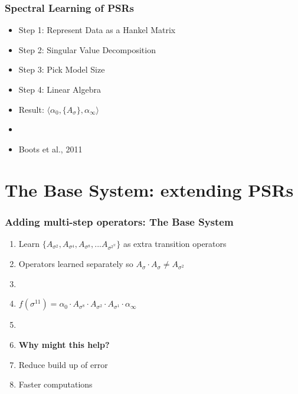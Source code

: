\documentclass{beamer}
\begin{document}

\begin{frame}
\frametitle{Spectral Learning of PSRs}

\begin{itemize}
\item[] Step 1: Represent Data as a Hankel Matrix
\item[] Step 2: Singular Value Decomposition
\item[] Step 3: Pick Model Size
\item[] Step 4: Linear Algebra
\item[] Result: $\langle \alpha_0, \{A_\sigma\},\alpha_\infty \rangle$ 
\item[]
\item[] Boots et al., 2011
\end{itemize}

\end{frame}

\section{The Base System: extending PSRs}

\begin{frame}
\frametitle{Adding multi-step operators: The Base System}
\begin{enumerate}

\item Learn $\{A_{\sigma^2}, A_{\sigma^4}, A_{\sigma^8}, ... A_{\sigma^{2^N}}\}$ as extra transition operators
\item[] Operators learned separately so $A_{\sigma} \cdot A_{\sigma} \neq A_{\sigma^2}$
\item[]

\item $f(\sigma^{11}) = \alpha_0 \cdot A_{\sigma^8} \cdot A_{\sigma^2} \cdot A_{\sigma^1} \cdot \alpha_\infty$
\item[]

\item \textbf{Why might this help?}
\item[] Reduce build up of error
\item[] Faster computations

\end{enumerate}
\end{frame}
\end{document}
